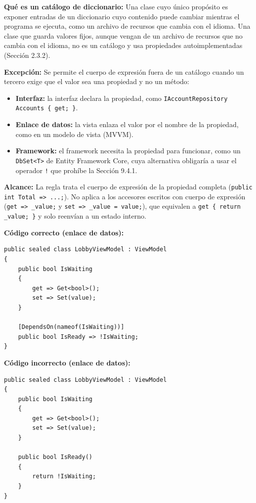 \textbf{Qué es un catálogo de diccionario:} Una clase cuyo único propósito es exponer entradas de un diccionario cuyo contenido puede cambiar mientras el programa se ejecuta, como un archivo de recursos que cambia con el idioma. Una clase que guarda valores fijos, aunque vengan de un archivo de recursos que no cambia con el idioma, no es un catálogo y usa propiedades autoimplementadas (Sección 2.3.2).

\textbf{Excepción:} Se permite el cuerpo de expresión fuera de un catálogo cuando un tercero exige que el valor sea una propiedad y no un método:
\begin{itemize}
    \item \textbf{Interfaz:} la interfaz declara la propiedad, como \texttt{IAccountRepository Accounts \{ get; \}}.
    \item \textbf{Enlace de datos:} la vista enlaza el valor por el nombre de la propiedad, como en un modelo de vista (MVVM).
    \item \textbf{Framework:} el framework necesita la propiedad para funcionar, como un \texttt{DbSet<T>} de Entity Framework Core, cuya alternativa obligaría a usar el operador \texttt{!} que prohíbe la Sección 9.4.1.
\end{itemize}

\textbf{Alcance:} La regla trata el cuerpo de expresión de la propiedad completa (\texttt{public int Total => ...;}). No aplica a los accesores escritos con cuerpo de expresión (\texttt{get => \_value;} y \texttt{set => \_value = value;}), que equivalen a \texttt{get \{ return \_value; \}} y solo reenvían a un estado interno.

\textbf{Código correcto (enlace de datos):}
\begin{lstlisting}[style=csharpstyle]
public sealed class LobbyViewModel : ViewModel
{
    public bool IsWaiting
    {
        get => Get<bool>();
        set => Set(value);
    }

    [DependsOn(nameof(IsWaiting))]
    public bool IsReady => !IsWaiting;
}
\end{lstlisting}

\textbf{Código incorrecto (enlace de datos):}
\begin{lstlisting}[style=csharpstyle]
public sealed class LobbyViewModel : ViewModel
{
    public bool IsWaiting
    {
        get => Get<bool>();
        set => Set(value);
    }

    public bool IsReady()
    {
        return !IsWaiting;
    }
}
\end{lstlisting}
